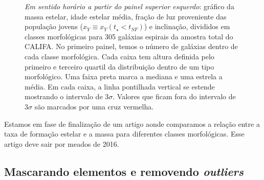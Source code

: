 \begin{figure}
	\centering
	\caption[Classificação por morfologia.]
	{\emph{Em sentido horário a partir do painel superior esquerdo}: gráfico da massa estelar, idade
	estelar média, fração de luz proveniente das população jovens ($x_Y \equiv x_Y(t_\star < t_{SF})$) e
	inclinação, divididos em classes morfológicas para 305 galáxias espirais da amostra total do
	CALIFA. No primeiro painel, temos o número de galáxias dentro de cada classe morfológica. Cada
	caixa tem altura definida pelo primeiro e terceiro quartil da distribuição dentro de um tipo
	morfológico. Uma faixa preta marca a mediana e uma estrela a média. Em cada caixa, a linha
	pontilhada vertical se estende mostrando o intervalo de $3\sigma$. Valores que ficam fora do
	intervalo de $3\sigma$ são marcados por uma cruz vermelha.}
	\label{fig:amostraMorf}
\end{figure}

Estamos em fase de finalização de um artigo aonde comparamos a relação entre a taxa de formação
estelar e a massa para diferentes classes morfológicas. Esse artigo deve sair por meados de 2016.

\subsection{Mascarando elementos e removendo {\em outliers}}
\label{sec:amostra:mask}

